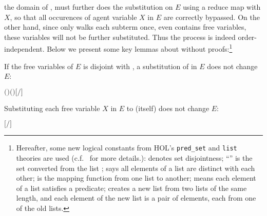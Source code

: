 the domain of ,  must further does the
substitution on $E$ using a reduce map with $X$, so that all
occurences of agent variable $X$ in $E$ are correctly bypassed. On the
other hand, since  only walks each subterm
once, even  contains free variables, these variables will
not be further substituted. Thus the process is indeed
order-independent. Below we present some key lemmas about
 without proofs:\footnote{Hereafter,
  some new logical constants from HOL's \texttt{pred_set}
and \texttt{list} theories are used (c.f.~\cite{holdesc} for more
details.):  denotes set disjointness;
``'' is the set converted from the list ;
 says
all elements of a list are distinct with each other;  is
the mapping function from one list to another;  means
each element of a list satisfies a predicate;  creates a
new list from two lists of the same length, and each element of the new list is a pair of
elements, each from one of the old lists.}

\begin{lemma}
If the free variables of $E$ is disjoint with , a
substitution of  in $E$ does not change $E$:
\begin{alltt}
\HOLTokenTurnstile{}  \ensuremath{(} \ensuremath{)} \ensuremath{(} \ensuremath{)} \HOLSymConst{\HOLTokenConj{}}   \HOLSymConst{\ensuremath{=}}   \HOLSymConst{\HOLTokenImp{}} \ensuremath{[}\ensuremath{/}\ensuremath{]}  \HOLSymConst{\ensuremath{=}} 
\end{alltt}
\end{lemma}

\begin{lemma}
Substituting each free variable $X$ in $E$ to  (itself)
does not change $E$:
\begin{alltt}
\HOLTokenTurnstile{}   \HOLSymConst{\HOLTokenImp{}} \ensuremath{[}  \ensuremath{/}\ensuremath{]}  \HOLSymConst{\ensuremath{=}} 
\end{alltt}
\end{lemma}

